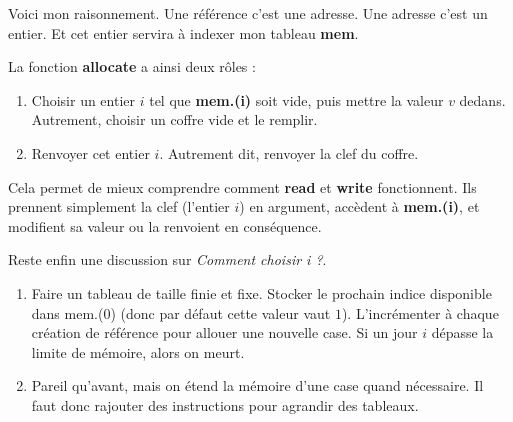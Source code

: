 \documentclass[a4paper,10pt]{report}
\begin{document}
Voici mon raisonnement. Une référence c'est une adresse. Une adresse c'est un entier. Et cet entier servira à indexer mon tableau \textbf{mem}.  
  
La fonction \textbf{allocate} a ainsi deux rôles :

\begin{enumerate}
\item Choisir un entier $i$ tel que \textbf{mem.(i)} soit vide, puis mettre la valeur $v$ dedans. Autrement, choisir un coffre vide et le remplir.  
\item Renvoyer cet entier $i$. Autrement dit, renvoyer la clef du coffre.  
\end{enumerate}

Cela permet de mieux comprendre comment \textbf{read} et \textbf{write} fonctionnent. Ils prennent simplement la clef (l'entier $i$) en argument, accèdent à \textbf{mem.(i)}, et modifient sa valeur ou la renvoient en conséquence.  
  
Reste enfin une discussion sur \textit{Comment choisir i ?}.  

\begin{enumerate}
\item Faire un tableau de taille finie et fixe. Stocker le prochain indice disponible dans mem.(0) (donc par défaut cette valeur vaut $1$). L'incrémenter à chaque création de référence pour allouer une nouvelle case. Si un jour $i$ dépasse la limite de mémoire, alors on meurt.
\item Pareil qu'avant, mais on étend la mémoire d'une case quand nécessaire. Il faut donc rajouter des instructions pour agrandir des tableaux. 
\end{enumerate}
\end{document}
